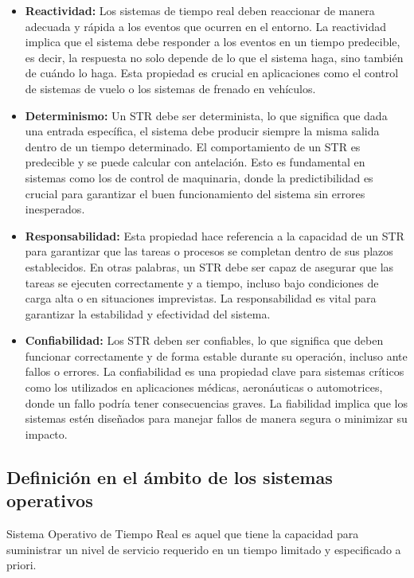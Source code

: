 \begin{itemize}
    \item \textbf{Reactividad:} Los sistemas de tiempo real deben reaccionar de manera adecuada y rápida a los eventos que ocurren en el entorno. La reactividad implica que el sistema debe responder a los eventos en un tiempo predecible, es decir, la respuesta no solo depende de lo que el sistema haga, sino también de cuándo lo haga. Esta propiedad es crucial en aplicaciones como el control de sistemas de vuelo o los sistemas de frenado en vehículos.
    
    \item \textbf{Determinismo:} Un STR debe ser determinista, lo que significa que dada una entrada específica, el sistema debe producir siempre la misma salida dentro de un tiempo determinado. El comportamiento de un STR es predecible y se puede calcular con antelación. Esto es fundamental en sistemas como los de control de maquinaria, donde la predictibilidad es crucial para garantizar el buen funcionamiento del sistema sin errores inesperados.
    
    \item \textbf{Responsabilidad:} Esta propiedad hace referencia a la capacidad de un STR para garantizar que las tareas o procesos se completan dentro de sus plazos establecidos. En otras palabras, un STR debe ser capaz de asegurar que las tareas se ejecuten correctamente y a tiempo, incluso bajo condiciones de carga alta o en situaciones imprevistas. La responsabilidad es vital para garantizar la estabilidad y efectividad del sistema.
    
    \item \textbf{Confiabilidad:} Los STR deben ser confiables, lo que significa que deben funcionar correctamente y de forma estable durante su operación, incluso ante fallos o errores. La confiabilidad es una propiedad clave para sistemas críticos como los utilizados en aplicaciones médicas, aeronáuticas o automotrices, donde un fallo podría tener consecuencias graves. La fiabilidad implica que los sistemas estén diseñados para manejar fallos de manera segura o minimizar su impacto.
\end{itemize}

\subsection{Definición en el ámbito de los sistemas operativos}

Sistema Operativo de Tiempo Real es aquel que tiene la capacidad para suministrar un nivel de servicio requerido en un tiempo limitado y especificado a priori.

